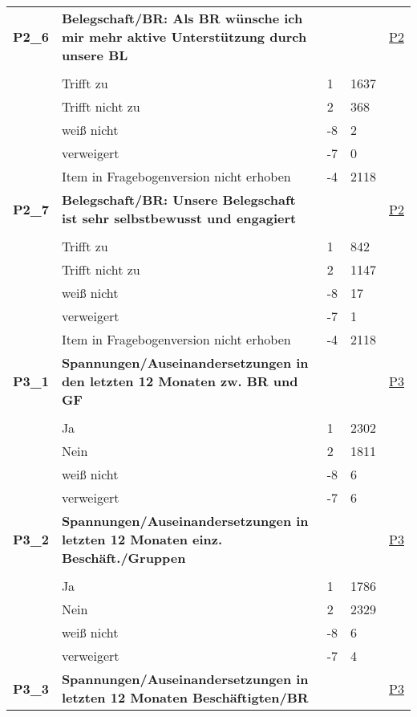 \begin{longtable}{| L{2.5cm} | L{8.25cm}| C{1.5cm} | R{1.25cm} | C{2.25cm} |  }
   \midrule
\textbf{P2\_6}\label{var:suf:P2:6} & \textbf{Belegschaft/BR: Als BR wünsche ich mir mehr aktive Unterstützung durch unsere BL} &  &  & \hyperref[P2]{P2} \\ 
   &  &  &  &  \\ 
   & Trifft zu & 1 & 1637 &  \\ 
   & Trifft nicht zu & 2 & 368 &  \\ 
   & weiß nicht & -8 & 2 &  \\ 
   & verweigert & -7 & 0 &  \\ 
   & Item in Fragebogenversion nicht erhoben & -4 & 2118 &  \\ 
   \midrule
\textbf{P2\_7}\label{var:suf:P2:7} & \textbf{Belegschaft/BR: Unsere Belegschaft ist sehr selbstbewusst und engagiert} &  &  & \hyperref[P2]{P2} \\ 
   &  &  &  &  \\ 
   & Trifft zu & 1 & 842 &  \\ 
   & Trifft nicht zu & 2 & 1147 &  \\ 
   & weiß nicht & -8 & 17 &  \\ 
   & verweigert & -7 & 1 &  \\ 
   & Item in Fragebogenversion nicht erhoben & -4 & 2118 &  \\ 
   \midrule
\textbf{P3\_1}\label{var:suf:P3:1} & \textbf{Spannungen/Auseinandersetzungen in den letzten 12 Monaten zw. BR und GF} &  &  & \hyperref[P3]{P3} \\ 
   &  &  &  &  \\ 
   & Ja & 1 & 2302 &  \\ 
   & Nein & 2 & 1811 &  \\ 
   & weiß nicht & -8 & 6 &  \\ 
   & verweigert & -7 & 6 &  \\ 
   \midrule
\textbf{P3\_2}\label{var:suf:P3:2} & \textbf{Spannungen/Auseinandersetzungen in letzten 12 Monaten einz. Beschäft./Gruppen} &  &  & \hyperref[P3]{P3} \\ 
   &  &  &  &  \\ 
   & Ja & 1 & 1786 &  \\ 
   & Nein & 2 & 2329 &  \\ 
   & weiß nicht & -8 & 6 &  \\ 
   & verweigert & -7 & 4 &  \\ 
   \midrule
\textbf{P3\_3}\label{var:suf:P3:3} & \textbf{Spannungen/Auseinandersetzungen in letzten 12 Monaten Beschäftigten/BR} &  &  & \hyperref[P3]{P3} \\ 

\end{longtable}
